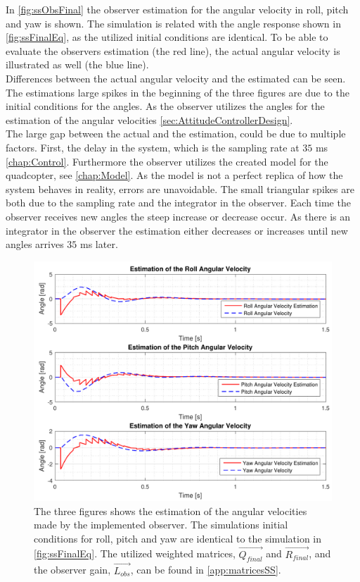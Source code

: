 In \autoref{fig:ssObsFinal} the observer estimation for the angular velocity in roll, pitch and yaw is shown. The simulation is related with the angle response shown in \autoref{fig:ssFinalEq}, as the utilized initial conditions are identical. To be able to evaluate the observers estimation (the red line), the actual angular velocity is illustrated as well (the blue line). \\ Differences between the actual angular velocity and the estimated can be seen. The estimations large spikes in the beginning of the three figures are due to the initial conditions for the angles. As the observer utilizes the angles for the estimation of the angular velocities \autoref{sec:AttitudeControllerDesign}. \\ The large gap between the actual and the estimation, could be due to multiple factors. First, the delay in the system, which is the sampling rate at $35$ \si{ms} \autoref{chap:Control}. Furthermore the observer utilizes the created model for the quadcopter, see \autoref{chap:Model}. As the model is not a perfect replica of how the system behaves in reality, errors are unavoidable. The small triangular spikes are both due to the sampling rate and the integrator in the observer. Each time the observer receives new angles the steep increase or decrease occur. As there is an integrator in the observer the estimation either decreases or increases until new angles arrives $35$ \si{ms} later.
%
\begin{figure}[H]
	\centering
	\includegraphics[scale=0.7]{figures/ssObsFinal.pdf}
	\caption{The three figures shows the estimation of the angular velocities made by the implemented observer. The simulations initial conditions for roll, pitch and yaw are identical to the simulation in \autoref{fig:ssFinalEq}. The utilized weighted matrices, $\vec{Q_{final}}$ and $\vec{R_{final}}$, and the observer gain, $\vec{L_{obs}}$, can be found in \autoref{app:matricesSS}.}
	\label{fig:ssObsFinal}
\end{figure}

